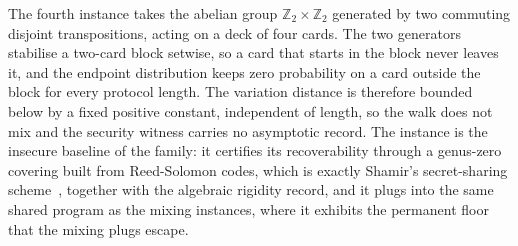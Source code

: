 \documentclass[a4paper,11pt]{article}
\begin{document}
The fourth instance takes the abelian group $\mathbb{Z}_2 \times \mathbb{Z}_2$
generated by two commuting disjoint transpositions, acting on a deck of four
cards. The two generators stabilise a two-card block setwise, so a card that
starts in the block never leaves it, and the endpoint distribution keeps zero
probability on a card outside the block for every protocol length. The variation
distance is therefore bounded below by a fixed positive constant, independent of
length, so the walk does not mix and the security witness carries no asymptotic
record. The instance is the insecure baseline of the family: it certifies its
recoverability through a genus-zero covering built from Reed-Solomon codes, which
is exactly Shamir's secret-sharing scheme~\cite{shamir1979}, together with the
algebraic rigidity
record, and it plugs into the same shared program as the mixing instances, where
it exhibits the permanent floor that the mixing plugs escape.



\end{document}
